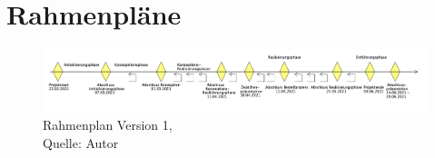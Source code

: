 \section{Rahmenpläne}\label{Rahmenplaene}
\begin{figure}[H]
    \centering
   \includegraphics[width=1\textwidth]{images/SoDa_Zeitstrahl_v1.png}
    \caption[SoDa Rahmenplan Version 1]{Rahmenplan Version 1,\\ Quelle: Autor}
    \label{img: SoDa Rahmenplan_v1}
\end{figure}